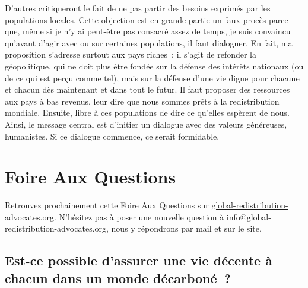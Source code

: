 \documentclass[a5paper,french,openany]{memoir}
\begin{document}
D'autres critiqueront le fait 
de ne pas partir des besoins exprimés par les populations locales. 
Cette objection est en grande partie un faux procès parce que, même si je n'y ai peut-être pas consacré assez de temps, je suis convaincu qu'avant d'agir avec ou sur certaines populations, il faut dialoguer. En fait, ma proposition s'adresse surtout aux pays riches~: il s'agit de refonder la géopolitique, qui ne doit plus être fondée sur la défense des intérêts nationaux (ou de ce qui est perçu comme tel), mais sur la défense d'une vie digne pour chacune et chacun dès maintenant et dans tout le futur. Il faut proposer des ressources aux pays à bas revenus, leur dire que nous sommes prêts à la redistribution mondiale. Ensuite, libre à ces populations de dire ce qu'elles espèrent de nous. 
Ainsi, le message central est d'initier un dialogue avec des valeurs généreuses, humanistes. Si ce dialogue commence, ce serait formidable. 

\chapter*{Foire Aux Questions}\label{ch:faq}

Retrouvez prochainement cette Foire Aux Questions sur \href{http://global-redistribution-advocates.org/}{global-redistribution-advocates.org}. N'hésitez pas à poser une nouvelle question à info@global-redistribution-advocates.org, nous y répondrons par mail et sur le site.

\section*{\normalsize Est-ce possible d'assurer une vie décente à chacun dans un monde décarboné~?}\label{q:decent}
\end{document}
